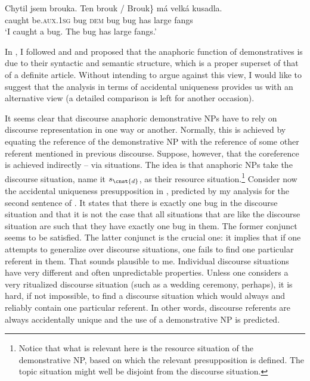 \documentclass[output=paper,colorlinks,citecolor=brown,newtxmath]{langscibook}
\begin{document}
\ea\label{simik:ex:anaph}\gll Chytil jsem brouka. \minsp{\{} Ten brouk / \minsp{\#} Brouk\} má velká kusadla.\\
caught be.\textsc{aux.1sg} bug {} \textsc{dem} bug {} {} bug has large fangs\\
\glt `I caught a bug. The bug has large fangs.'
\z

\noindent In \citet{Simik2016}, I followed \citet{Elbourne2008} and \citet{Schwarz2009} and proposed that the anaphoric function of demonstratives is due to their syntactic and semantic structure, which is a proper superset of that of a definite article. Without intending to argue against this view, I would like to suggest that the analysis in terms of accidental uniqueness provides us with an alternative view (a detailed comparison is left for another occasion).

It seems clear that discourse anaphoric demonstrative NPs have to rely on discourse representation in one way or another. Normally, this is achieved by equating the reference of the demonstrative NP with the reference of some other referent mentioned in previous discourse. Suppose, however, that the coreference is achieved indirectly -- via situations. The idea is that anaphoric NPs take the discourse situation, name it $s_{\cnst{d}}$, as their resource situation.\footnote{Notice that what is relevant here is the resource situation of the demonstrative NP, based on which the relevant presupposition is defined. The topic situation might well be disjoint from the discourse situation.} Consider now the accidental uniqueness presupposition in , predicted by my analysis for the second sentence of . It states that there is exactly one bug in the discourse situation and that it is not the case that all situations that are like the discourse situation are such that they have exactly one bug in them. The former conjunct seems to be satisfied. The latter conjunct is the crucial one: it implies that if one attempts to generalize over discourse situations, one fails to find one particular referent in them. That sounds plausible to me. Individual discourse situations have very different and often unpredictable properties. Unless one considers a very ritualized discourse situation (such as a wedding ceremony, perhaps), it is hard, if not impossible, to find a discourse situation which would always and reliably contain one particular referent. In other words, discourse referents are always accidentally unique and the use of a demonstrative NP is predicted.
\end{document}
